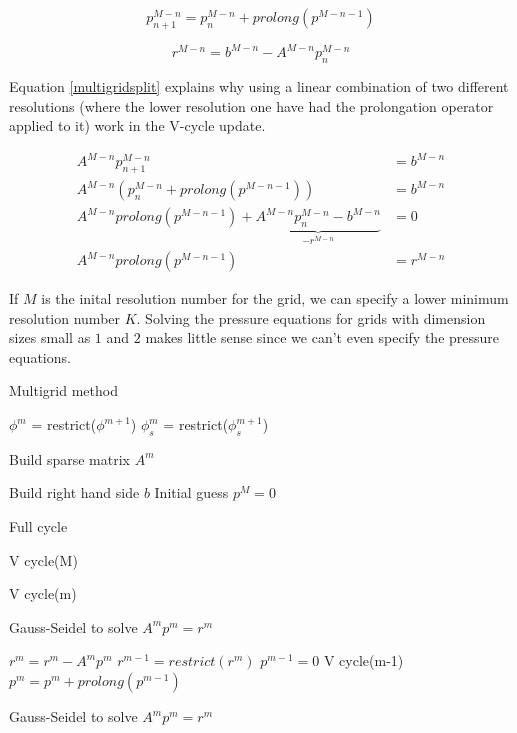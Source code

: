 \begin{equation}
p^{M-n}_{n+1} = p^{M-n}_n + prolong(p^{M-n-1})
\end{equation}

\begin{equation}
r^{M-n} = b^{M-n} - A^{M-n} p^{M-n}_n 
\end{equation}

Equation \ref{multigridsplit} explains why using a linear combination of two different resolutions (where the lower resolution one have had the prolongation operator applied to it) work in the V-cycle update.

\begin{equation}
\begin{split}
A^{M-n} p^{M-n}_{n+1} &= b^{M-n} \\
A^{M-n} (p^{M-n}_n + prolong(p^{M-n-1})) &= b^{M-n} \\
A^{M-n} prolong(p^{M-n-1}) +  \underbrace{ A^{M-n} p^{M-n}_n -  b^{M-n} }_\text{$-r^{M-n}$} &= 0 \\
A^{M-n} prolong(p^{M-n-1})  &= r^{M-n}
\end{split}
\label{multigridsplit}
\end{equation}

If $M$ is the inital resolution number for the grid, we can specify a lower minimum resolution number $K$. Solving the pressure equations for grids with dimension sizes small as $1$ and $2$ makes little sense since we can't even specify the pressure equations. 

\begin{algorithm}
\caption{Multigrid method}
\begin{algorithmic}[1]
\STATE $\phi^m$ = restrict($\phi^{m+1}$)
\STATE $\phi^m_s$ = restrict($\phi^{m+1}_s$)
\ENDFOR

\STATE Build sparse matrix $A^m$
\ENDFOR

\STATE Build right hand side $b$
\STATE Initial guess $p^M = 0$

\STATE Full cycle
\ENDFOR

\STATE V cycle(M)
\ENDFOR

\end{algorithmic}
\label{multigridalgorithm}
\end{algorithm}


\begin{algorithm}
\caption{V cycle(m)}
\begin{algorithmic}[1]

\STATE Gauss-Seidel to solve $A^mp^m = r^m$
\ENDFOR

\STATE $r^m = r^m - A^mp^m$
\STATE $r^{m-1} = restrict(r^m)$
\STATE $p^{m-1} = 0$
\STATE V cycle(m-1)
\STATE $p^m = p^m + prolong(p^{m-1})$

\STATE Gauss-Seidel to solve $A^mp^m = r^m$
\ENDFOR

\end{algorithmic}
\label{multigridalgorithm}
\end{algorithm}

